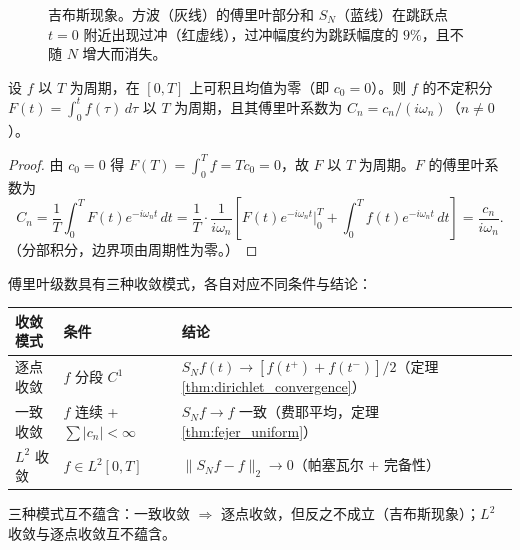 \begin{figure}[htbp]
\centering
{}
\caption{吉布斯现象。方波（灰线）的傅里叶部分和 $S_N$（蓝线）在跳跃点 $t = 0$ 附近出现过冲（红虚线），过冲幅度约为跳跃幅度的 $9\%$，且不随 $N$ 增大而消失。}
\label{fig:gibbs}
\end{figure}

\begin{property}[傅里叶级数的积分保持]\label{prop:fourier_integration_preservation}
设 $f$ 以 $T$ 为周期，在 $[0,T]$ 上可积且均值为零（即 $c_0 = 0$）。则 $f$ 的不定积分 $F(t) = \int_0^t f(\tau)\,d\tau$ 以 $T$ 为周期，且其傅里叶系数为 $C_n = c_n / (i\omega_n)$（$n \neq 0$）。
\end{property}

\begin{proof}
由 $c_0 = 0$ 得 $F(T) = \int_0^T f = T c_0 = 0$，故 $F$ 以 $T$ 为周期。$F$ 的傅里叶系数为
\[
C_n = \frac{1}{T}\int_0^T F(t) e^{-i\omega_n t}\,dt = \frac{1}{T} \cdot \frac{1}{i\omega_n}\left[ F(t) e^{-i\omega_n t} \Big|_0^T + \int_0^T f(t) e^{-i\omega_n t}\,dt \right] = \frac{c_n}{i\omega_n}.
\]
（分部积分，边界项由周期性为零。）
\end{proof}

\begin{remark}[傅里叶级数三种收敛模式]\label{rem:fourier_convergence_modes}
傅里叶级数具有三种收敛模式，各自对应不同条件与结论：
\begin{center}
\begin{tabular}{@{}p{2.5cm}p{4.0cm}p{5.0cm}@{}}
\toprule
收敛模式 & 条件 & 结论 \\
\midrule
逐点收敛 & $f$ 分段 $C^1$ & $S_N f(t) \to [f(t^+)+f(t^-)]/2$（定理 \ref{thm:dirichlet_convergence}） \\
一致收敛 & $f$ 连续 + $\sum |c_n| < \infty$ & $S_N f \to f$ 一致（费耶平均，定理 \ref{thm:fejer_uniform}） \\
$L^2$ 收敛 & $f \in L^2[0,T]$ & $\|S_N f - f\|_2 \to 0$（帕塞瓦尔 + 完备性） \\
\bottomrule
\end{tabular}
\end{center}
三种模式互不蕴含：一致收敛 $\Rightarrow$ 逐点收敛，但反之不成立（吉布斯现象）；$L^2$ 收敛与逐点收敛互不蕴含。
\end{remark}

